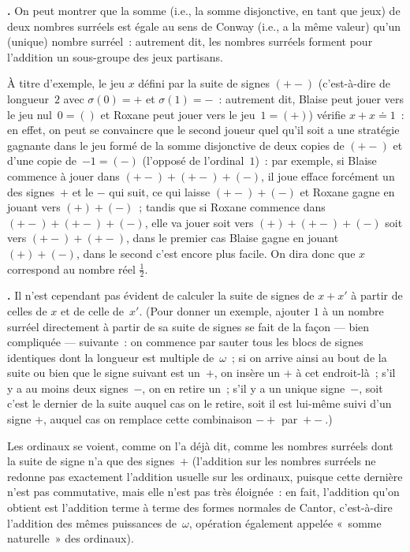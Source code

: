 \documentclass[12pt,a4paper]{article}
\theoremstyle{definition}
\newcommand\thingy{%
\refstepcounter{comcnt}\smallskip\noindent\textbf{\thecomcnt.} }
\begin{document}
\thingy On peut montrer que la somme (i.e., la somme disjonctive, en
tant que jeux) de deux nombres surréels est égale au sens de Conway
(i.e., a la même valeur) qu'un (unique) nombre surréel : autrement
dit, les nombres surréels forment pour l'addition un sous-groupe des
jeux partisans.

À titre d'exemple, le jeu $x$ défini par la suite de signes $(+-)$
(c'est-à-dire de longueur $2$ avec $\sigma(0)=+$ et $\sigma(1)=-$ :
autrement dit, Blaise peut jouer vers le jeu nul $0 = ()$ et Roxane
peut jouer vers le jeu $1 = (+)$) vérifie $x+x \doteq 1$ : en effet,
on peut se convaincre que le second joueur quel qu'il soit a une
stratégie gagnante dans le jeu formé de la somme disjonctive de deux
copies de $(+-)$ et d'une copie de $-1 = (-)$ (l'opposé de
l'ordinal $1$) : par exemple, si Blaise commence à jouer dans $(+-) +
(+-) + (-)$, il joue efface forcément un des signes $+$ et le $-$ qui
suit, ce qui laisse $(+-) + (-)$ et Roxane gagne en jouant vers $(+) +
(-)$ ; tandis que si Roxane commence dans $(+-) + (+-) + (-)$, elle va
jouer soit vers $(+) + (+-) + (-)$ soit vers $(+-) + (+-)$, dans le
premier cas Blaise gagne en jouant $(+) + (-)$, dans le second c'est
encore plus facile.  On dira donc que $x$ correspond au nombre réel
$\frac{1}{2}$.

\thingy Il n'est cependant pas évident de calculer la suite de signes
de $x+x'$ à partir de celles de $x$ et de celle de $x'$.  (Pour donner
un exemple, ajouter $1$ à un nombre surréel directement à partir de sa
suite de signes se fait de la façon — bien compliquée — suivante : on
commence par sauter tous les blocs de signes identiques dont la
longueur est multiple de $\omega$ ; si on arrive ainsi au bout de la
suite ou bien que le signe suivant est un $+$, on insère un $+$ à cet
endroit-là ; s'il y a au moins deux signes $-$, on en retire un ; s'il
y a un unique signe $-$, soit c'est le dernier de la suite auquel cas
on le retire, soit il est lui-même suivi d'un signe $+$, auquel cas on
remplace cette combinaison $-+$ par $+-$.)

Les ordinaux se voient, comme on l'a déjà dit, comme les nombres
surréels dont la suite de signe n'a que des signes $+$ (l'addition sur
les nombres surréels ne redonne pas exactement l'addition usuelle sur
les ordinaux, puisque cette dernière n'est pas commutative, mais elle
n'est pas très éloignée : en fait, l'addition qu'on obtient est
l'addition terme à terme des formes normales de Cantor, c'est-à-dire
l'addition des mêmes puissances de $\omega$, opération également
appelée « somme naturelle » des ordinaux).
\end{document}
